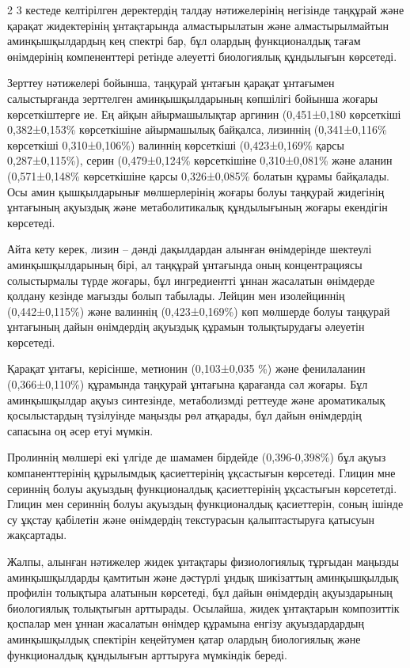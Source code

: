 \begin{multicols}{2}
3 кестеде келтірілген деректердің талдау нәтижелерінің негізінде
таңқұрай және қарақат жидектерінің ұнтақтарында алмастырылатын және
алмастырылмайтын аминқышқылдардың кең спектрі бар, бұл олардың
функционалдық тағам өнімдерінің компененттері ретінде әлеуетті
биологиялық құндылығын көрсетеді.

Зерттеу нәтижелері бойынша, таңқурай ұнтағын қарақат ұнтағымен
салыстырғанда зерттелген аминқышқылдарының көпшілігі бойынша жоғары
көрсеткіштерге ие. Ең айқын айырмашылықтар аргинин (0,451±0,180
көрсеткіші 0,382±0,153\% көрсеткішіне айырмашылық байқалса, лизиннің
(0,341±0,116\% көрсеткіші 0,310±0,106\%) валиннің көрсеткіші
(0,423±0,169\% қарсы 0,287±0,115\%), серин (0,479±0,124\% көрсеткішіне
0,310±0,081\% және аланин (0,571±0,148\% көрсеткішіне қарсы
0,326±0,085\% болатын құрамы байқалады. Осы амин қышқылдарынығ
мөлшерлерінің жоғары болуы таңқурай жидегінің ұнтағының ақуыздық және
метаболитикалық құндылығының жоғары екендігін көрсетеді.

Айта кету керек, лизин -- дәнді дақылдардан алынған өнімдерінде шектеулі
аминқышқылдарының бірі, ал таңқұрай ұнтағында оның концентрациясы
солыстырмалы түрде жоғары, бұл ингредиентті ұннан жасалатын өнімдерде
қолдану кезінде мағызды болып табылады. Лейцин мен изолейциннің
(0,442±0,115\%) және валиннің (0,423±0,169\%) көп мөлшерде болуы
таңқурай ұнтағының дайын өнімдердің ақуыздық құрамын толықтырудағы
әлеуетін көрсетеді.

Қарақат ұнтағы, керісінше, метионин (0,103±0,035 \%) және фенилаланин
(0,366±0,110\%) құрамында таңқурай ұнтағына қарағанда сәл жоғары. Бұл
аминқышқылдар ақуыз синтезінде, метаболизмді реттеуде және ароматикалық
қосылыстардың түзілуінде маңызды рөл атқарады, бұл дайын өнімдердің
сапасына оң әсер етуі мүмкін.

Пролиннің мөлшері екі үлгіде де шамамен бірдейде (0,396-0,398\%) бұл
ақуыз компаненттерінің құрылымдық қасиеттерінің ұқсастығын көрсетеді.
Глицин мне сериннің болуы ақуыздың функционалдық қасиеттерінің
ұқсастығын көрсететді. Глицин мен сериннің болуы ақуыздың функционалдық
қасиеттерін, соның ішінде су ұқстау қабілетін және өнімдердің
текстурасын қалыптастыруға қатысуын жақсартады.

Жалпы, алынған нәтижелер жидек ұнтақтары физиологиялық тұрғыдан маңызды
аминқышқылдарды қамтитын және дәстүрлі ұндық шикізаттың аминқышқылдық
профилін толықтыра алатынын көрсетеді, бұл дайын өнімдердің ақуыздарының
биологиялық толықтығын арттырады. Осылайша, жидек ұнтақтарын композиттік
қоспалар мен ұннан жасалатын өнімдер құрамына енгізу ақуыздардардың
аминқышқылдық спектірін кеңейтумен қатар олардың биологиялық және
функционалдық құндылығын арттыруға мүмкіндік береді.


\end{multicols}
